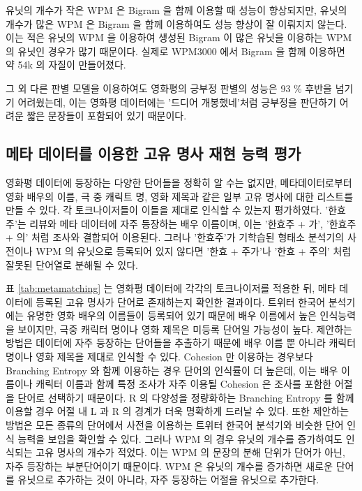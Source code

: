 \documentclass[oneside, ko,phd]{snuthesis_utf8_kor}
\begin{document}
유닛의 개수가 작은 WPM 은 Bigram 을 함께 이용할 때 성능이 향상되지만, 유닛의 개수가 많은 WPM 은 Bigram 을 함께 이용하여도 성능 향상이 잘 이뤄지지 않는다.
이는 적은 유닛의 WPM 을 이용하여 생성된 Bigram 이 많은 유닛을 이용하는 WPM 의 유닛인 경우가 많기 때문이다.
실제로 WPM3000 에서 Bigram 을 함께 이용하면 약 54k 의 자질이 만들어졌다.

그 외 다른 판별 모델을 이용하여도 영화평의 긍부정 판별의 성능은 93 \% 후반을 넘기기 어려웠는데, 이는 영화평 데이터에는 '드디어 개봉했네'처럼 긍부정을 판단하기 어려운 짧은 문장들이 포함되어 있기 때문이다.


\subsection{메타 데이터를 이용한 고유 명사 재현 능력 평가}
영화평 데이터에 등장하는 다양한 단어들을 정확히 알 수는 없지만, 메타데이터로부터 영화 배우의 이름, 극 중 캐릭트 명, 영화 제목과 같은 일부 고유 명사에 대한 리스트를 만들 수 있다.
각 토크나이저들이 이들을 제대로 인식할 수 있는지 평가하였다.
'한효주'는 리뷰와 메타 데이터에 자주 등장하는 배우 이름이며, 이는 '한효주 + 가', '한효주 + 의' 처럼 조사와 결합되어 이용된다.
그러나 '한효주'가 기학습된 형태소 분석기의 사전이나 WPM 의 유닛으로 등록되어 있지 않다면 '한효 + 주가'나 '한효 + 주의' 처럼 잘못된 단어열로 분해될 수 있다.

표 \ref{tab:metamatching} 는 영화평 데이터에 각각의 토크나이저를 적용한 뒤, 메타 데이터에 등록된 고유 명사가 단어로 존재하는지 확인한 결과이다.
트위터 한국어 분석기에는 유명한 영화 배우의 이름들이 등록되어 있기 때문에 배우 이름에서 높은 인식능력을 보이지만, 극중 캐릭터 명이나 영화 제목은 미등록 단어일 가능성이 높다.
제안하는 방법은 데이터에 자주 등장하는 단어들을 추출하기 때문에 배우 이름 뿐 아니라 캐릭터 명이나 영화 제목을 제대로 인식할 수 있다.
Cohesion 만 이용하는 경우보다 Branching Entropy 와 함께 이용하는 경우 단어의 인식률이 더 높은데, 이는 배우 이름이나 캐릭터 이름과 함께 특정 조사가 자주 이용될 Cohesion 은 조사를 포함한 어절을 단어로 선택하기 때문이다.
R 의 다양성을 정량화하는 Branching Entropy 를 함께 이용할 경우 어절 내 L 과 R 의 경계가 더욱 명확하게 드러날 수 있다.
또한 제안하는 방법은 모든 종류의 단어에서 사전을 이용하는 트위터 한국어 분석기와 비슷한 단어 인식 능력을 보임을 확인할 수 있다.
그러나 WPM 의 경우 유닛의 개수를 증가하여도 인식되는 고유 명사의 개수가 적었다.
이는 WPM 의 문장의 분해 단위가 단어가 아닌, 자주 등장하는 부분단어이기 때문이다.
WPM 은 유닛의 개수를 증가하면 새로운 단어를 유닛으로 추가하는 것이 아니라, 자주 등장하는 어절을 유닛으로 추가한다.
\end{document}
